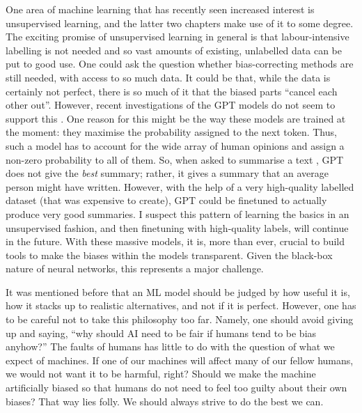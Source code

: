 One area of machine learning that has recently seen increased interest is unsupervised learning,
and the latter two chapters make use of it to some degree.
The exciting promise of unsupervised learning in general is
that labour-intensive labelling is not needed and so vast amounts of existing, unlabelled data can be put to good use.
One could ask the question whether bias-correcting methods are still needed, with access to so much data.
It could be that, while the data is certainly not perfect,
there is so much of it that the biased parts ``cancel each other out''.
However, recent investigations of the GPT models \citep{radford2018improving,radford2019language,brown2020language} do not seem to support this \citep{khalifa2021distributional}.
One reason for this might be the way these models are trained at the moment:
they maximise the probability assigned to the next token.
Thus, such a model has to account for the wide array of human opinions and assign a non-zero probability to all of them.
So, when asked to summarise a text \citep{stiennon2020learning}, GPT does not give the \emph{best} summary;
rather, it gives a summary that an average person might have written.
However, with the help of a very high-quality labelled dataset (that was expensive to create),
GPT could be finetuned to actually produce very good summaries.
I suspect this pattern of learning the basics in an unsupervised fashion,
and then finetuning with high-quality labels, will continue in the future.
With these massive models,
it is, more than ever, crucial to build tools to make the biases within the models transparent.
Given the black-box nature of neural networks, this represents a major challenge.

It was mentioned before that an \ac{ML} model should be judged by how useful it is,
how it stacks up to realistic alternatives, and not if it is perfect.
However, one has to be careful not to take this philosophy too far.
Namely, one should avoid giving up and saying,
``why should AI need to be fair if humans tend to be bias anyhow?''
The faults of humans has little to do with the question of what we expect of machines.
If one of our machines will affect many of our fellow humans,
we would not want it to be harmful, right?
Should we make the machine artificially biased
so that humans do not need to feel too guilty about their own biases?
That way lies folly.
We should always strive to do the best we can.

